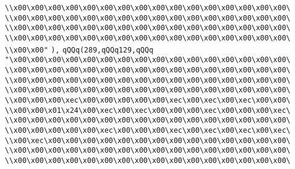 \verb|\\x00\x00\x00\x00\x00\x00\x00\x00\x00\x00\x00\x00\x00\x00\x00\x00\|\newline
\verb|\\x00\x00\x00\x00\x00\x00\x00\x00\x00\x00\x00\x00\x00\x00\x00\x00\|\newline
\verb|\\x00\x00\x00\x00\x00\x00\x00\x00\x00\x00\x00\x00\x00\x00\x00\x00\|\newline
\verb|\\x00\x00\x00\x00\x00\x00\x00\x00\x00\x00\x00\x00\x00\x00\x00\x00\|\newline
\verb|\\x00\x00"|\newline
\verb|),|\newline
\verb|qQQq(289,qQQq129,qQQq|\newline
\verb|"\x00\x00\x00\x00\x00\x00\x00\x00\x00\x00\x00\x00\x00\x00\x00\x00\|\newline
\verb|\\x00\x00\x00\x00\x00\x00\x00\x00\x00\x00\x00\x00\x00\x00\x00\x00\|\newline
\verb|\\x00\x00\x00\x00\x00\x00\x00\x00\x00\x00\x00\x00\x00\x00\x00\x00\|\newline
\verb|\\x00\x00\x00\x00\x00\x00\x00\x00\x00\x00\x00\x00\x00\x00\x00\x00\|\newline
\verb|\\x00\x00\x00\xec\x00\x00\x00\x00\x00\xec\x00\xec\x00\xec\x00\x00\|\newline
\verb|\\x00\x00\x01\x24\x00\xec\x00\xec\x00\x00\x00\xec\x00\x00\x00\xec\|\newline
\verb|\\x00\x00\x00\x00\x00\x00\x00\x00\x00\x00\x00\x00\x00\x00\x00\x00\|\newline
\verb|\\x00\x00\x00\x00\x00\xec\x00\x00\x00\xec\x00\xec\x00\xec\x00\xec\|\newline
\verb|\\x00\xec\x00\x00\x00\x00\x00\x00\x00\x00\x00\x00\x00\x00\x00\x00\|\newline
\verb|\\x00\x00\x00\x00\x00\x00\x00\x00\x00\x00\x00\x00\x00\x00\x00\x00\|\newline
\verb|\\x00\x00\x00\x00\x00\x00\x00\x00\x00\x00\x00\x00\x00\x00\x00\x00\|\newline
